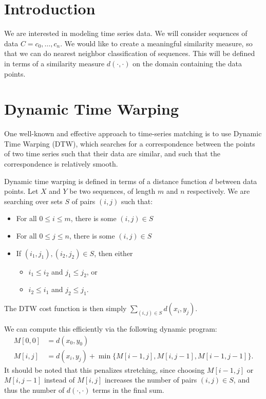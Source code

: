 
\section{Introduction}
We are interested in modeling time series data. We will consider
sequences of data $C=c_0, \dots, c_n$. We would like to create a
meaningful similarity measure, so that we can do nearest neighbor
classification of sequences. This will be defined in terms of a
similarity measure $d(\cdot,\cdot)$ on the domain containing the data
points.

\section{Dynamic Time Warping}

One well-known and effective approach to time-series matching is to
use Dynamic Time Warping (DTW), which searches for a correspondence
between the points of two time series such that their data are
similar, and such that the correspondence is relatively smooth.

Dynamic time warping is defined in terms of a distance function $d$
between data points. Let $X$ and $Y$ be two sequences, of length $m$
and $n$ respectively. We are searching over sets $S$ of pairs $(i,j)$
such that:
\begin{itemize}
\item For all $0\le i \le m$, there is some $(i,j)\in S$
\item For all $0\le j \le n$, there is some $(i,j)\in S$
\item If $(i_1,j_1), (i_2,j_2)\in S$, then either
\begin{itemize}
\item $i_1\le i_2$ and  $j_1 \le j_2$, or
\item $i_2\le i_1$ and  $j_2 \le j_1$.
\end{itemize}
\end{itemize}
The DTW cost function is then simply $\sum_{(i,j)\in S} d(x_i,y_j)$.

We can compute this efficiently via the following dynamic program: 
\begin{align*}
M[0,0] &= d(x_0, y_0) \\
M[i,j] &= d(x_i, y_j) + \min \{ M[i-1,j], M[i,j-1], M[i-1,j-1]\}.
\end{align*}
It should be noted that this penalizes stretching, since choosing
$M[i-1,j]$ or $M[i,j-1]$ instead of $M[i,j]$ increases the number of
pairs $(i,j)\in S$, and thus the number of $d(\cdot,\cdot)$ terms in
the final sum.

